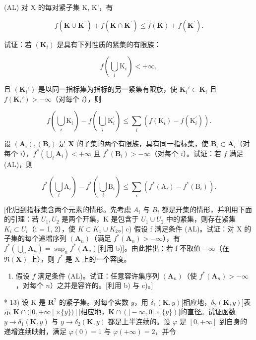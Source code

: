 (AL) 对 X 的每对紧子集 K, K'，有

\[
f (\mathbf {K} \cup \mathbf {K} ^ {\prime}) + f (\mathbf {K} \cap \mathbf {K} ^ {\prime}) \leqslant f (\mathbf {K}) + f (\mathbf {K} ^ {\prime}).
\]

试证：若 \((\mathbf{K}_i)\) 是具有下列性质的紧集的有限族：

\[
f \left(\bigcup_ {i} \mathrm{K} _ {i}\right) <   + \infty ,
\]

且 \((\mathbf{K}_i')\) 是以同一指标集为指标的另一紧集有限族，使 \(\mathbf{K}_i' \subset \mathbf{K}_i\) 且 \(f(\mathbf{K}_i') > -\infty\)（对每个 \(i\)），则

\[
f \left(\bigcup_ {i} \mathrm{K} _ {i}\right) - f \left(\bigcup_ {i} \mathrm{K} _ {i} ^ {\prime}\right) \leqslant \sum_ {i} \left(f \left(\mathrm{K} _ {i}\right) - f \left(\mathrm{K} _ {i} ^ {\prime}\right)\right).
\]

设 \((\mathbf{A}_i), (\mathbf{B}_i)\) 是 \(\mathbf{X}\) 的子集的两个有限族，具有同一指标集，使 \(\mathbf{B}_i \subset \mathbf{A}_i\)（对每个 \(i\)），\(f^* \left( \bigcup_i \mathbf{A}_i \right) < +\infty\) 且 \(f^*(\mathbf{B}_i) > -\infty\)（对每个 \(i\)）。试证：若 \(f\) 满足 (AL)，则

\[
f ^ {*} \left(\bigcup_ {i} \mathrm{A} _ {i}\right) - f ^ {*} \left(\bigcup_ {i} \mathrm{B} _ {i}\right) \leqslant \sum_ {i} \left(f ^ {*} (\mathrm{A} _ {i}) - f ^ {*} (\mathrm{B} _ {i})\right).
\]

{[}化归到指标集含两个元素的情形。先考虑 \(A_{i}\) 与 \(B_{i}\) 都是开集的情形，并利用下面的引理：若 \(U_{1}, U_{2}\) 是两个开集，K 是包含于 \(U_{1} \cup U_{2}\) 中的紧集，则存在紧集 \(K_{i} \subset U_{i}\)（i = 1, 2），使 \(K \subset K_{1} \cup K_{2}\)。{]} c) 假设 f 满足条件 (AL)。试证：对 X 的子集的每个递增序列 \((\mathbf{A}_{n})\)（满足 \(f^{*}(\mathbf{A}_{n}) > -\infty\)），有 \(f^{*}\left(\bigcup_{n} \mathbf{A}_{n}\right) = \sup_{n} f^{*}(\mathbf{A}_{n})\){[}利用 b){]}。由此推出：若 f 不取值 \(-\infty\)（在 \(\Re(\mathbf{X})\) 上），则 \(f^{*}\) 是 X 上的一个容度。

\begin{enumerate}
\def\labelenumi{\alph{enumi})}
\setcounter{enumi}{3}
\tightlist
\item
  假设 \(f\) 满足条件 (AL)。试证：任意容许集序列 \((\mathbf{A}_n)\)（使 \(f^*(\mathbf{A}_n) > -\infty\)，对每个 \(n\)）之并是容许的。{[}利用 b) 与 c)。{]}
\end{enumerate}

* 13) 设 K 是 \(\mathbf{R}^2\) 的紧子集。对每个实数 \(y\)，用 \(\delta_1(\mathbf{K}, y)\){[}相应地，\(\delta_2(\mathbf{K}, y)\){]}表示 \(\mathbf{K} \cap ([0, +\infty [\times \{y\})]\){[}相应地，\(\mathbf{K} \cap (]-\infty, 0] \times \{y\})\){]}的直径。试证函数 \(y \to \delta_1(\mathbf{K}, y)\) 与 \(y \to \delta_2(\mathbf{K}, y)\) 都是上半连续的。设 \(\varphi\) 是 \([0, +\infty]\) 到自身的递增连续映射，满足 \(\varphi(0) = 1\) 与 \(\varphi(+\infty) = 2\)，并令

